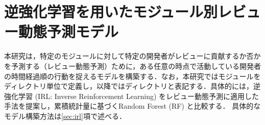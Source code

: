 \documentclass[submit,noauthor,ses,dvipdfmx]{ipsj}
\newcommand{\todo}[1]{\colorbox{yellow}{{\bf TODO}:}{\color{red} {\textbf{[#1]}}}}
\begin{document}



\vspace{-4mm}
\section{逆強化学習を用いたモジュール別レビュー動態予測モデル}\label{sec:model}

本研究は，特定のモジュールに対して特定の開発者がレビューに貢献するか否かを予測する（レビュー動態予測）ために，ある任意の時点で活動している開発者の時間経過順の行動を捉えるモデルを構築する．なお，本研究ではモジュールをディレクトリ単位で定義し，以降ではディレクトリと表記する．具体的には，逆強化学習 (IRL: Inverse Reinforcement Learning) をレビュー動態予測に適用した手法を提案し，累積統計量に基づくRandom Forest (RF) と比較する．
具体的なモデル構築方法は\ref{sec:irl}項で述べる．


\end{document}

